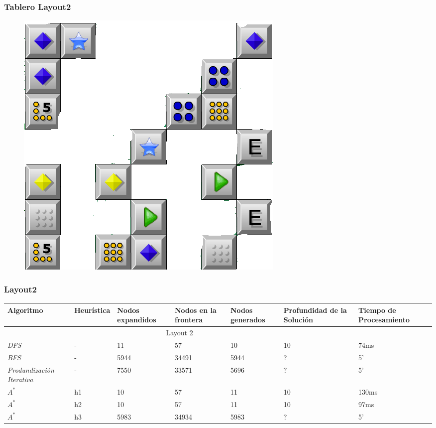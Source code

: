 \documentclass{beamer}
\begin{document}
\begin{frame}
\frametitle{Tablero Layout2}
\begin{figure}[hb]
	\includegraphics[scale=0.3]{../Boards/Layout3.png}
	 \label{fig:layout3}
\end{figure}
\end{frame}

\begin{frame}
\frametitle{Layout2}

\tiny{
\begin{table}[h]
\begin{center}
	\begin{tabular}{|p{1.3cm}|p{1.0cm}|p{1cm}|p{1cm}|p{1cm}|p{1cm}|p{2cm}|}
	\hline
	 Algoritmo & Heur\'istica & Nodos expandidos & Nodos en la frontera & Nodos generados & Profundidad de la Soluci\'on & Tiempo de Procesamiento\\
	\hline \hline
		 \multicolumn{6}{|c|}{Layout 2} \\
	\hline
	\textit{DFS} & - &  11 & 57 & 10 & 10 & 74ms \\
	\textit{BFS} & - & 5944 & 34491 & 5944 & ? & 5' \\
	\textit{Produndizaci\'on Iterativa} &  - & 7550 & 33571 & 5696 & ? & 5' \\	
	\textit{$A^*$} & h1 & 10 & 57 & 11 & 10 & 130ms \\
	\textit{$A^*$} & h2 & 10 & 57 & 11 & 10 & 97ms \\
	\textit{$A^*$} & h3 & 5983 & 34934 & 5983 & ? & 5'\\
	\hline
	\end{tabular}
\end{center}
\label{tab:costLayout3}
\end{table}}

\end{frame}
\end{document}
